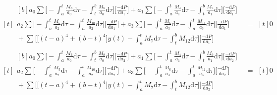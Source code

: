 \documentclass[letterpaper%
, twoside%
, 12pt%
,memoire%
, english%
,creativecommons,hyperref%
]{thETS}
\theoremstyle{newThmStyle}
\begin{document}
\begin{equation}\label{eqn.115}
\begin{aligned}[t]
	\begin{aligned}[b]
	a_{0} \sum \bigg[-\int_{a}^{t}\frac{M_{3}}{a_{0}}\mathrm{d}\tau-\int_{t}^{b}\frac{M_{8}}{a_{0}}\mathrm{d}\tau\bigg] \bigg[\frac{-\mathrm{d}P}{\mathrm{d}a_{1}}\bigg] + a_{1} \sum \bigg[-\int_{a}^{t}\frac{M_{4}}{a_{1}}\mathrm{d}\tau-\int_{t}^{b}\frac{M_{9}}{a_{1}}\mathrm{d}\tau\bigg] \bigg[\frac{-\mathrm{d}P}{\mathrm{d}a_{1}}\bigg] \\
	a_{2} \sum \bigg[-\int_{a}^{t}\frac{M_{5}}{a_{2}}\mathrm{d}\tau-\int_{a}^{t}\frac{M_{10}}{a_{2}}\mathrm{d}\tau\bigg] \bigg[\frac{-\mathrm{d}P}{\mathrm{d}a_{1}}\bigg] + a_{3} \sum \bigg[-\int_{a}^{t}\frac{M_{6}}{a_{3}}\mathrm{d}\tau-\int_{a}^{t}\frac{M_{11}}{a_{3}}\mathrm{d}\tau\bigg] \bigg[\frac{-\mathrm{d}P}{\mathrm{d}a_{1}}\bigg] \\ 
	{} +\sum\bigg[\big[(t-a)^4+(b-t)^4\big]y(t) -\int_{a}^{t}{M_{7}}\mathrm{d}\tau-\int_{t}^{b}{M_{12}}\mathrm{d}\tau \bigg]\bigg[\frac{-\mathrm{d}P}{\mathrm{d}a_{1}}\bigg]
	\end{aligned}
	& =
	\begin{aligned}[t]
	0
	\end{aligned}
\end{aligned}
\end{equation}
\begin{equation}\label{eqn.116}
\begin{aligned}[t]
	\begin{aligned}[b]
	a_{0} \sum \bigg[-\int_{a}^{t}\frac{M_{3}}{a_{0}}\mathrm{d}\tau-\int_{t}^{b}\frac{M_{8}}{a_{0}}\mathrm{d}\tau\bigg] \bigg[\frac{-\mathrm{d}P}{\mathrm{d}a_{2}}\bigg] + a_{1} \sum \bigg[-\int_{a}^{t}\frac{M_{4}}{a_{1}}\mathrm{d}\tau-\int_{t}^{b}\frac{M_{9}}{a_{1}}\mathrm{d}\tau\bigg] \bigg[\frac{-\mathrm{d}P}{\mathrm{d}a_{2}}\bigg] \\
	a_{2} \sum \bigg[-\int_{a}^{t}\frac{M_{5}}{a_{2}}\mathrm{d}\tau-\int_{a}^{t}\frac{M_{10}}{a_{2}}\mathrm{d}\tau\bigg] \bigg[\frac{-\mathrm{d}P}{\mathrm{d}a_{2}}\bigg] + a_{3} \sum \bigg[-\int_{a}^{t}\frac{M_{6}}{a_{3}}\mathrm{d}\tau-\int_{a}^{t}\frac{M_{11}}{a_{3}}\mathrm{d}\tau\bigg] \bigg[\frac{-\mathrm{d}P}{\mathrm{d}a_{2}}\bigg] \\ 
	{} +\sum\bigg[\big[(t-a)^4+(b-t)^4\big]y(t) -\int_{a}^{t}{M_{7}}\mathrm{d}\tau-\int_{t}^{b}{M_{12}}\mathrm{d}\tau \bigg]\bigg[\frac{-\mathrm{d}P}{\mathrm{d}a_{2}}\bigg]
	\end{aligned}
	& =
	\begin{aligned}[t]
	0
	\end{aligned}
\end{aligned}
\end{equation}
\end{document}
